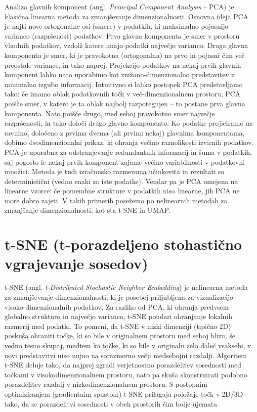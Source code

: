 Analiza glavnih komponent (angl. \textit{Principal Component Analysis} – PCA) je klasična linearna metoda za zmanjševanje dimenzionalnosti. Osnovna ideja PCA je najti nove ortogonalne osi (smere) v podatkih, ki maksimalno pojasnijo varianco (razpršenost) podatkov. Prva glavna komponenta je smer v prostoru vhodnih podatkov, vzdolž katere imajo podatki največjo varianco. Druga glavna komponenta je smer, ki je pravokotna (ortogonalna) na prvo in pojasni čim več preostale variance, in tako naprej. Projekcijo podatkov na nekaj prvih glavnih komponent lahko nato uporabimo kot znižano-dimenzionalno predstavitev z minimalno izgubo informacij. Intuitivno si lahko postopek PCA predstavljamo tako: če imamo oblak podatkovnih točk v več-dimenzionalnem prostoru, PCA poišče smer, v katero je ta oblak najbolj razpotegnjen – to postane prva glavna komponenta. Nato poišče drugo, med seboj pravokotno smer največje razpršenosti, in tako določi drugo glavno komponento. Ko podatke projiciramo na ravnino, določeno z prvima dvema (ali prvimi nekaj) glavnima komponentama, dobimo dvodimenzionalni prikaz, ki ohranja večino raznolikosti izvirnih podatkov. PCA je uporabna za odstranjevanje redundantnih informacij in šuma v podatkih, saj pogosto le nekaj prvih komponent zajame večino variabilnosti v podatkovni množici. Metoda je tudi izračunsko razmeroma učinkovita in rezultati so deterministični (vedno enaki za iste podatke). Vendar pa je PCA omejena na linearne vzorce: če pomembne strukture v podatkih niso linearne, jih PCA ne more dobro zajeti. V takih primerih posežemo po nelinearnih metodah za zmanjšanje dimenzionalnosti, kot sta t-SNE in UMAP. \section{t-SNE (t-porazdeljeno stohastično vgrajevanje sosedov)}
t-SNE (angl. \textit{t-Distributed Stochastic Neighbor Embedding}) je nelinearna metoda za zmanjševanje dimenzionalnosti, ki je posebej priljubljena za vizualizacijo visoko-dimenzionalnih podatkov. Za razliko od PCA, ki ohranja predvsem globalno strukturo in največjo varianco, t-SNE poudari ohranjanje lokalnih razmerij med podatki. To pomeni, da t-SNE v nizki dimenziji (tipično 2D) poskuša ohraniti točke, ki so bile v originalnem prostoru med seboj blizu, še vedno tesno skupaj, medtem ko točke, ki so bile v originalu zelo daleč vsaksebi, v novi predstavitvi niso nujno na sorazmerno večji medsebojni razdalji. Algoritem t-SNE deluje tako, da najprej zgradi verjetnostno porazdelitev sosednosti med točkami v visokodimenzionalnem prostoru, nato pa skuša skonstruirati podobno porazdelitev razdalj v nizkodimenzionalnem prostoru. S postopnim optimiziranjem (gradientnim spustom) t-SNE prilagaja položaje točk v 2D/3D tako, da se porazdelitvi sosednosti v obeh prostorih čim bolje ujemata
